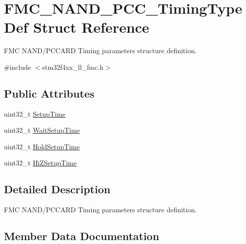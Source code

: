 \hypertarget{struct_f_m_c___n_a_n_d___p_c_c___timing_type_def}{}\section{F\+M\+C\+\_\+\+N\+A\+N\+D\+\_\+\+P\+C\+C\+\_\+\+Timing\+Type\+Def Struct Reference}
\label{struct_f_m_c___n_a_n_d___p_c_c___timing_type_def}


F\+MC N\+A\+N\+D/\+P\+C\+C\+A\+RD Timing parameters structure definition.  




{\ttfamily \#include $<$stm32f4xx\+\_\+ll\+\_\+fmc.\+h$>$}

\subsection*{Public Attributes}
\begin{DoxyCompactItemize}
\item 
uint32\+\_\+t \hyperlink{struct_f_m_c___n_a_n_d___p_c_c___timing_type_def_a7f999bb43ce5bd642439b90056dd2819}{Setup\+Time}
\item 
uint32\+\_\+t \hyperlink{struct_f_m_c___n_a_n_d___p_c_c___timing_type_def_abec51342237cf19aacfbbdfa866648d9}{Wait\+Setup\+Time}
\item 
uint32\+\_\+t \hyperlink{struct_f_m_c___n_a_n_d___p_c_c___timing_type_def_a57728d0f89fd95015265e4dd195226d3}{Hold\+Setup\+Time}
\item 
uint32\+\_\+t \hyperlink{struct_f_m_c___n_a_n_d___p_c_c___timing_type_def_a0dbc37d1de815af58ecfd6c4e06b176d}{Hi\+Z\+Setup\+Time}
\end{DoxyCompactItemize}


\subsection{Detailed Description}
F\+MC N\+A\+N\+D/\+P\+C\+C\+A\+RD Timing parameters structure definition. 

\subsection{Member Data Documentation}
